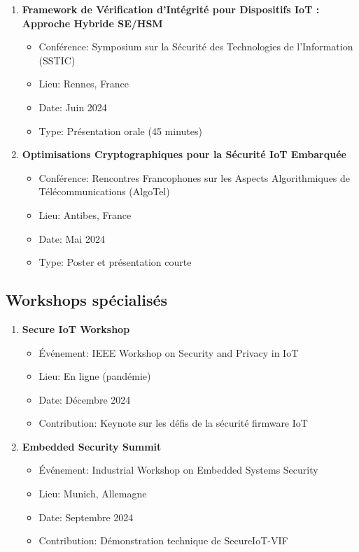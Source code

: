 \begin{enumerate}
    \item \textbf{Framework de Vérification d'Intégrité pour Dispositifs IoT : Approche Hybride SE/HSM}
    \begin{itemize}
        \item Conférence: Symposium sur la Sécurité des Technologies de l'Information (SSTIC)
        \item Lieu: Rennes, France
        \item Date: Juin 2024
        \item Type: Présentation orale (45 minutes)
    \end{itemize}
    
    \item \textbf{Optimisations Cryptographiques pour la Sécurité IoT Embarquée}
    \begin{itemize}
        \item Conférence: Rencontres Francophones sur les Aspects Algorithmiques de Télécommunications (AlgoTel)
        \item Lieu: Antibes, France
        \item Date: Mai 2024
        \item Type: Poster et présentation courte
    \end{itemize}
\end{enumerate}

\subsection{Workshops spécialisés}

\begin{enumerate}
    \item \textbf{Secure IoT Workshop}
    \begin{itemize}
        \item Événement: IEEE Workshop on Security and Privacy in IoT
        \item Lieu: En ligne (pandémie)
        \item Date: Décembre 2024
        \item Contribution: Keynote sur les défis de la sécurité firmware IoT
    \end{itemize}
    
    \item \textbf{Embedded Security Summit}
    \begin{itemize}
        \item Événement: Industrial Workshop on Embedded Systems Security
        \item Lieu: Munich, Allemagne
        \item Date: Septembre 2024
        \item Contribution: Démonstration technique de SecureIoT-VIF
    \end{itemize}
\end{enumerate}

